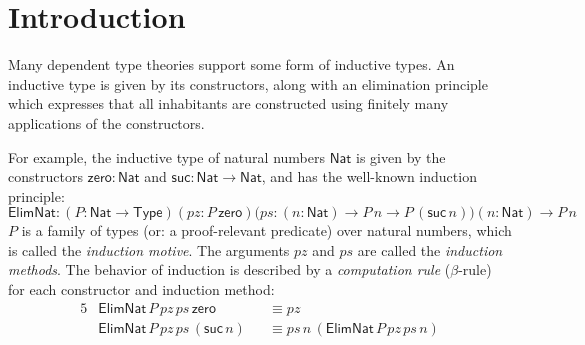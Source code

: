 \documentclass[dvipsnames]{lmcs} %
\newcommand{\ra}{\rightarrow}
\newcommand{\Nat}{\mathsf{Nat}}
\newcommand{\zero}{\mathsf{zero}}
\newcommand{\suc}{\mathsf{suc}}
\newcommand{\Elim}{\mathsf{Elim}}
\newcommand{\Rec}{\mathsf{Rec}}
\newcommand{\1}{\mathsf{1}} \renewcommand{\Pr}{\mathsf{Pr}}
\theoremstyle{plain}\newtheorem{satz}[thm]{Satz} %
\begin{document}
\maketitle


\section{Introduction}
\label{sec:intro}

Many dependent type theories support some form of inductive types. An
inductive type is given by its constructors, along with an elimination
principle which expresses that all inhabitants are constructed using
finitely many applications of the constructors.

For example, the inductive type of natural numbers $\Nat$ is given by
the constructors $\zero:\Nat$ and $\suc:\Nat \ra \Nat$, and has the
well-known induction principle:
\[
  \Elim\Nat:(P:\Nat \ra \mathsf{Type})(pz: P\,\zero)\big(ps:(n:\Nat)\ra P\,n\ra P\,(\suc\,n)\big)(n:\Nat)\ra P\,n
\]
\noindent $P$ is a family of types (or: a proof-relevant predicate) over natural
numbers, which is called the \emph{induction motive}. The arguments $pz$ and
$ps$ are called the \emph{induction methods}. The behavior of induction is
described by a \emph{computation rule} ($\beta$-rule) for each constructor
and induction method:
\begin{alignat*}{5}
  & \Elim\Nat\,P\,pz\,ps\,\zero && \equiv pz \\
  & \Elim\Nat\,P\,pz\,ps\,(\suc\,n) && \equiv ps\,n\,(\Elim\Nat\,P\,pz\,ps\,n)
\end{alignat*}


\end{document}
